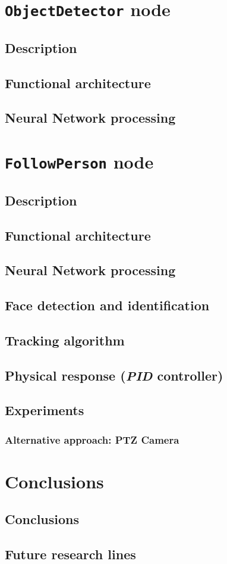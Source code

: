 \chapter{\texttt{ObjectDetector} node}
\section{Description}
\section{Functional architecture}
\section{Neural Network processing}


\chapter{\texttt{FollowPerson} node}
\label{chap:followperson}
\section{Description}
\section{Functional architecture}
\section{Neural Network processing}
\section{Face detection and identification}
\section{Tracking algorithm}
\section{Physical response (\emph{PID} controller)}
\section{Experiments}
\subsection{Alternative approach: PTZ Camera}
\label{sec:follow_ptz}


\chapter{Conclusions}
	\section{Conclusions}
	\section{Future research lines}